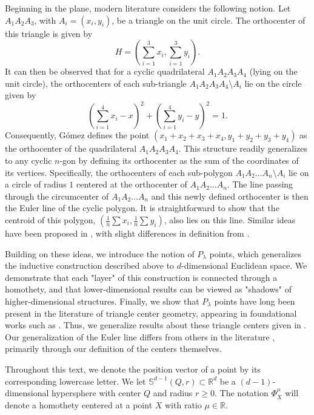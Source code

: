 \documentclass{birkjour}
\theoremstyle{definition}
\theoremstyle{remark}
\numberwithin{equation}{section}
\begin{document}
Beginning in the plane, modern literature \cite{Gomez} considers the following notion. Let $A_{1}A_{2}A_{3}$, with $A_i = (x_i, y_i)$, be a triangle on the unit circle. The orthocenter of this triangle is given by
\begin{equation}
    H = \left( \sum_{i=1}^3 x_i, \sum_{i=1}^{3} y_i \right).
\end{equation}
It can then be observed that for a cyclic quadrilateral $A_1A_2A_3A_4$ (lying on the unit circle), the orthocenters of each sub-triangle $A_1A_2A_3A_4 \setminus A_i$ lie on the circle given by
\begin{equation}
    \left( \sum_{i=1}^{4} x_i - x \right)^2 + \left( \sum_{i=1}^{4} y_i - y \right)^2 = 1.
\end{equation}
Consequently, Gómez \cite{Gomez} defines the point $(x_1+x_2+x_3+x_4, y_1+y_2+y_3+y_4)$ as the orthocenter of the quadrilateral $A_1A_2A_3A_4$. This structure readily generalizes to any cyclic $n$-gon by defining its orthocenter as the sum of the coordinates of its vertices. Specifically, the orthocenters of each sub-polygon $A_1A_2\ldots A_n \setminus A_i$ lie on a circle of radius $1$ centered at the orthocenter of $A_1A_2\ldots A_n$. The line passing through the circumcenter of $A_1A_2\ldots A_n$ and this newly defined orthocenter is then the Euler line of the cyclic polygon. It is straightforward to show that the centroid of this polygon, $(\frac{1}{n}\sum x_i, \frac{1}{n} \sum y_i )$, also lies on this line. Similar ideas have been proposed in \cite{Yaglom,Andrica}, with slight differences in definition from \cite{Collings}. 

Building on these ideas, we introduce the notion of $P_{\lambda}$ points, which generalizes the inductive construction described above to $d$-dimensional Euclidean space. We demonstrate that each "layer" of this construction is connected through a homothety, and that lower-dimensional results can be viewed as "shadows" of higher-dimensional structures. Finally, we show that $P_{\lambda}$ points have long been present in the literature of triangle center geometry, appearing in foundational works such as \cite{Kimberling}. Thus, we generalize results about these triangle centers given in \cite{Collings, Gomez,Yaglom,Andrica, Rabinowitz2025, Bradley,Mammana}. Our generalization of the Euler line differs from others in the literature \cite{Buba,Myakishev,Snapper,Tabachnikov}, primarily through our definition of the centers themselves. 

Throughout this text, we denote the position vector of a point by its corresponding lowercase letter. We let $\mathbb{S}^{d-1}(Q,r) \subset \mathbb{R}^d$ be a $(d-1)$-dimensional hypersphere with center $Q$ and radius $r \geq 0$. The notation $\Phi_{X}^{\mu}$ will denote a homothety centered at a point $X$ with ratio $\mu \in \mathbb{R}$.
\end{document}
